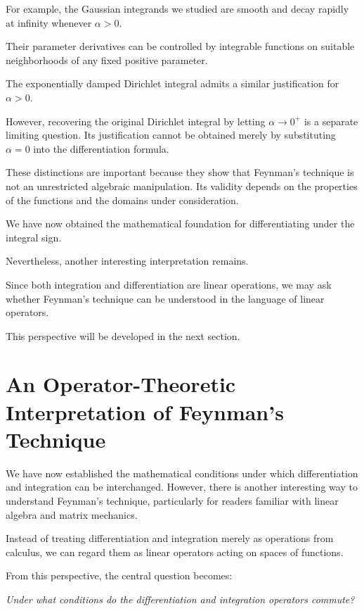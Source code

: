 \documentclass[11pt,a4paper]{article}
\theoremstyle{definition}
\theoremstyle{remark}
\begin{document}
For example, the Gaussian
integrands we studied are
smooth and decay rapidly
at infinity whenever
$\alpha>0$.

Their parameter derivatives
can be controlled by
integrable functions on
suitable neighborhoods
of any fixed positive
parameter.

The exponentially damped
Dirichlet integral admits
a similar justification
for $\alpha>0$.

However, recovering the
original Dirichlet integral
by letting $\alpha\to0^+$
is a separate limiting
question. Its justification
cannot be obtained merely
by substituting $\alpha=0$
into the differentiation
formula.

These distinctions are
important because they
show that Feynman's technique
is not an unrestricted
algebraic manipulation.
Its validity depends on
the properties of the
functions and the domains
under consideration.

\medskip

We have now obtained the
mathematical foundation
for differentiating under
the integral sign.

Nevertheless, another
interesting interpretation
remains.

Since both integration
and differentiation are
linear operations, we may
ask whether Feynman's
technique can be understood
in the language of
linear operators.

This perspective will
be developed in the
next section.

\section{An Operator-Theoretic Interpretation
of Feynman's Technique}

We have now established the mathematical
conditions under which differentiation
and integration can be interchanged. However, there is another interesting
way to understand Feynman's technique,
particularly for readers familiar
with linear algebra and matrix mechanics.

Instead of treating differentiation
and integration merely as operations
from calculus, we can regard them as
linear operators acting on spaces
of functions.

From this perspective, the central
question becomes:

\medskip

\emph{Under what conditions do the
differentiation and integration
operators commute?}
\end{document}

